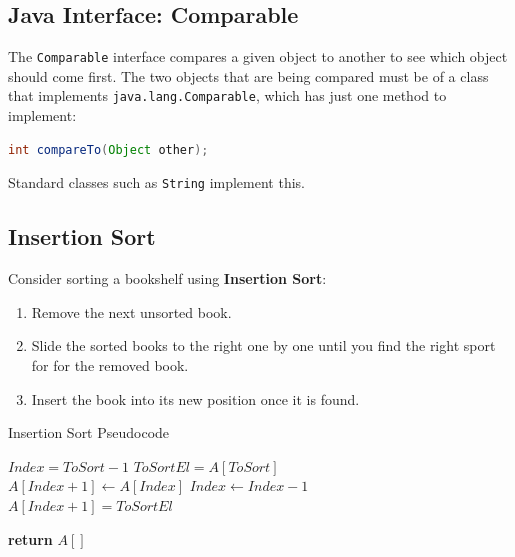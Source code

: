 \documentclass[11pt]{article}
\begin{document}
\subsection{Java Interface: Comparable}
The \verb|Comparable| interface  compares a given object to another to see which object should come first. 
The two objects that are being compared must be of a class that implements \verb|java.lang.Comparable|, which has just one method to implement: 
\begin{lstlisting}[language=java] 
int compareTo(Object other); 
\end{lstlisting} 

Standard classes such as \verb|String| implement this.

\subsection{Insertion Sort} 
Consider sorting a bookshelf using \textbf{Insertion Sort}: 
\begin{enumerate} 
    \item   Remove the next unsorted book.
    \item   Slide the sorted books to the right one by one until you find the right sport for for the removed book. 
    \item   Insert the book into its new position once it is found.
\end{enumerate}

\begin{algorithm}
    \caption{Insertion Sort Pseudocode}
    \begin{algorithmic}
         
         

                \State $Index = ToSort -1$ 
                \State $ToSortEl = A[ToSort]$ 
                \\
                    \State $A[Index+1] \gets A[Index]$ 
                    \State $Index \gets Index - 1$
                \EndWhile
                \\ 
                \State $A[Index+1] = ToSortEl$ 
            \EndFor

            \State \textbf{return} $A[]$ 
        \EndProcedure
    \end{algorithmic}
\end{algorithm}
\end{document}
